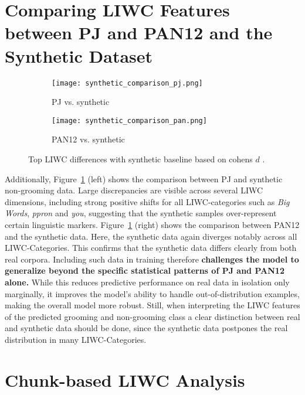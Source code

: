 \section{Comparing LIWC Features between PJ and PAN12 and the Synthetic Dataset} \label{sec:liwc_synthetic_comparison}
\begin{figure}[ht]
  \centering
  \begin{subfigure}[t]{0.48\textwidth}
    \texttt{[image: synthetic\_comparison\_pj.png]}
    \caption{PJ vs. synthetic}
  \end{subfigure}\hfill
  \begin{subfigure}[t]{0.48\textwidth}
    \texttt{[image: synthetic\_comparison\_pan.png]}
    \caption{PAN12 vs. synthetic}
  \end{subfigure}
  \caption[Top 30 LIWC Differences with Synthetic Baseline]{Top LIWC differences with synthetic baseline based on cohens $d$ \cite{cohen1988}.}
  \label{fig:liwc_synth_side_by_side}
\end{figure}



Additionally, Figure~\ref{fig:liwc_synth_side_by_side} (left) shows the comparison between PJ and synthetic non-grooming data. Large discrepancies are visible across several LIWC dimensions, including strong positive shifts for all LIWC-categories such as \textit{Big Words}, \textit{ppron} and \textit{you}, suggesting that the synthetic samples over-represent certain linguistic markers.  Figure~\ref{fig:liwc_synth_side_by_side} (right) shows the comparison between PAN12 and the synthetic data. Here, the synthetic data again diverges notably across all LIWC-Categories. This confirms that the synthetic data differs clearly from both real corpora. Including such data in training therefore \textbf{challenges the model to generalize beyond the specific statistical patterns of PJ and PAN12 alone.} While this reduces predictive performance on real data in isolation only marginally, it improves the model’s ability to handle out-of-distribution examples, making the overall model more robust. Still, when interpreting the LIWC features of the predicted grooming and non-grooming class a clear distinction between real and synthetic data should be done, since the synthetic data postpones the real distribution in many LIWC-Categories.


\section{Chunk-based LIWC Analysis} \label{sec:chunk_based_liwc_analysis}


